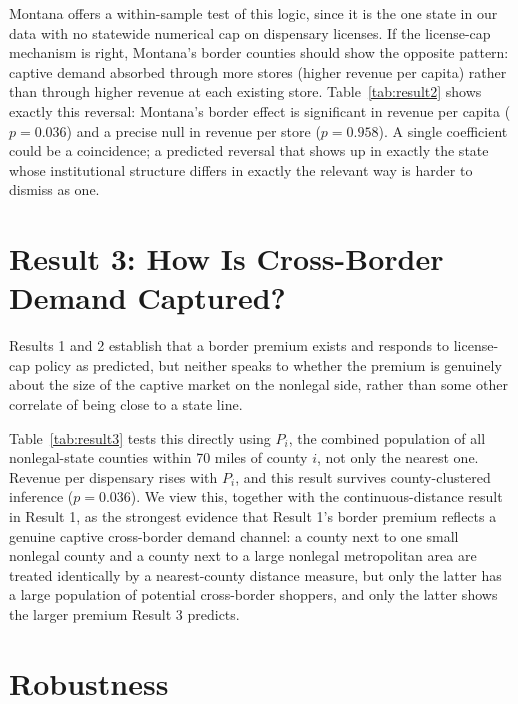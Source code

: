 \documentclass[12pt]{article}
\begin{document}


Montana offers a within-sample test of this logic, since it is the one state in our data with no statewide
numerical cap on dispensary licenses. If the license-cap mechanism is right, Montana's border counties should
show the opposite pattern: captive demand absorbed through more stores (higher revenue per capita) rather
than through higher revenue at each existing store. Table~\ref{tab:result2} shows exactly this reversal:
Montana's border effect is significant in revenue per capita ($p=0.036$) and a precise null in revenue per
store ($p=0.958$). A single coefficient could be a coincidence; a predicted reversal that shows up in exactly
the state whose institutional structure differs in exactly the relevant way is harder to dismiss as one.

\section{Result 3: How Is Cross-Border Demand Captured?}
\label{sec:result3}

Results 1 and 2 establish that a border premium exists and responds to license-cap policy as predicted, but
neither speaks to whether the premium is genuinely about the size of the captive market on the nonlegal
side, rather than some other correlate of being close to a state line.



Table~\ref{tab:result3} tests this directly using $P_i$, the combined population of all nonlegal-state
counties within 70 miles of county $i$, not only the nearest one. Revenue per dispensary rises with $P_i$,
and this result survives county-clustered inference ($p=0.036$). We view this, together with the
continuous-distance result in Result 1, as the strongest evidence that Result 1's border premium reflects a
genuine captive cross-border demand channel: a county next to one small nonlegal county and a county next to
a large nonlegal metropolitan area are treated identically by a nearest-county distance measure, but only
the latter has a large population of potential cross-border shoppers, and only the latter shows the larger
premium Result 3 predicts.

\section{Robustness}
\label{sec:robustness}
\end{document}
